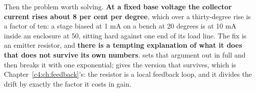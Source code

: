 Then the problem worth solving. \textbf{At a fixed base voltage the collector current rises about
8 per cent per degree}, which over a thirty-degree rise is a factor of ten: a stage biased at 1 mA
on a bench at 20 degrees is at 10 mA inside an enclosure at 50, sitting hard against one end of its
load line. The fix is an emitter resistor, and \textbf{there is a tempting explanation of what it
does that does not survive its own numbers}.  sets that argument out in full and
then breaks it with one exponential;  gives the version that survives, which is
Chapter~\ref{c4:ch:feedback}'s: the resistor is a local feedback loop, and it divides the drift by
exactly the factor it costs in gain.





